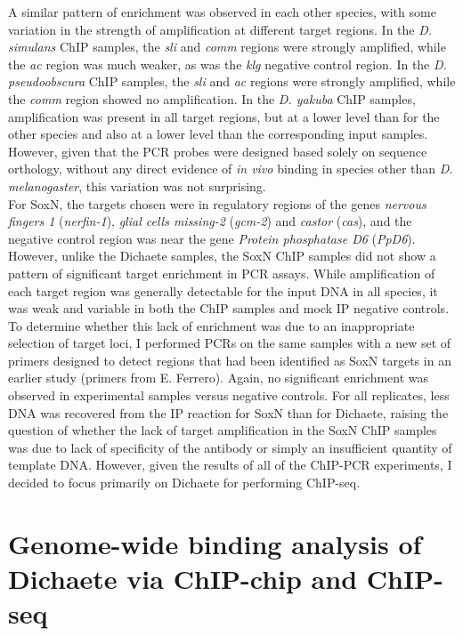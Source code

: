 A similar pattern of enrichment was observed in each other species, with some variation in the strength of amplification at different target regions. In the \emph{D. simulans} ChIP samples, the \emph{sli} and \emph{comm} regions were strongly amplified, while the \emph{ac} region was much weaker, as was the \emph{klg} negative control region. In the \emph{D. pseudoobscura} ChIP samples, the \emph{sli} and \emph{ac} regions were strongly amplified, while the \emph{comm} region showed no amplification. In the \emph{D. yakuba} ChIP samples, amplification was present in all target regions, but at a lower level than for the other species and also at a lower level than the corresponding input samples. However, given that the PCR probes were designed based solely on sequence orthology, without any direct evidence of \emph{in vivo} binding in species other than \emph{D. melanogaster}, this variation was not surprising.\\

For SoxN, the targets chosen were in regulatory regions of the genes \emph{nervous fingers 1} (\emph{nerfin-1}), \emph{glial cells missing-2} (\emph{gcm-2}) and \emph{castor} (\emph{cas}), and the negative control region was near the gene \emph{Protein phosphatase D6} (\emph{PpD6}). However, unlike the Dichaete samples, the SoxN ChIP samples did not show a pattern of significant target enrichment in PCR assays. While amplification of each target region was generally detectable for the input DNA in all species, it was weak and variable in both the ChIP samples and mock IP negative controls. To determine whether this lack of enrichment was due to an inappropriate selection of target loci, I performed PCRs on the same samples with a new set of primers designed to detect regions that had been identified as SoxN targets in an earlier study \citep{girard_chromatin_2006} (primers from E. Ferrero). Again, no significant enrichment was observed in experimental samples versus negative controls. For all replicates, less DNA was recovered from the IP reaction for SoxN than for Dichaete, raising the question of whether the lack of target amplification in the SoxN ChIP samples was due to lack of specificity of the antibody or simply an insufficient quantity of template DNA. However, given the results of all of the ChIP-PCR experiments, I decided to focus primarily on Dichaete for performing ChIP-seq.

\section{Genome-wide binding analysis of Dichaete via ChIP-chip and ChIP-seq}

